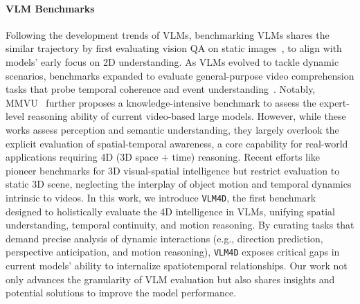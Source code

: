 \paragraph{VLM Benchmarks}%
Following the development trends of VLMs, benchmarking VLMs shares the similar trajectory by first evaluating vision QA on static images~\cite{li2024seed, liu2024mmbench, he2024mmworld,yue2024mmmu}, to align with models’ early focus on 2D understanding. As VLMs evolved to tackle dynamic scenarios, benchmarks expanded to evaluate general-purpose video comprehension tasks that probe temporal coherence and event understanding~\cite{ning2023video, khattak2024good, li2024videoeval, fu2024video, li2024mvbench}. Notably, MMVU~\cite{zhao2025mmvu} further proposes a knowledge-intensive benchmark to assess the expert-level reasoning ability of current video-based large models. However, while these works assess perception and semantic understanding, they largely overlook the explicit evaluation of spatial-temporal awareness, a core capability for real-world applications requiring 4D (3D space + time) reasoning. Recent efforts like~\cite{yang2024thinking} pioneer benchmarks for 3D visual-spatial intelligence but restrict evaluation to static 3D scene, neglecting the interplay of object motion and temporal dynamics intrinsic to videos. In this work, we introduce \texttt{VLM4D}, the first benchmark designed to holistically evaluate the 4D intelligence in VLMs, unifying spatial understanding, temporal continuity, and motion reasoning. By curating tasks that demand precise analysis of dynamic interactions (e.g., direction prediction, perspective anticipation, and motion reasoning), \texttt{VLM4D} exposes critical gaps in current models' ability to internalize spatiotemporal relationships. Our work not only advances the granularity of VLM evaluation but also shares insights and potential solutions to improve the model performance.

